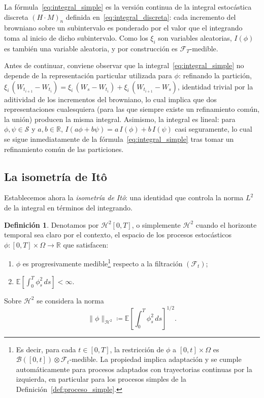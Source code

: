 \documentclass[11pt,a4paper,oneside]{report}
\theoremstyle{plain}
\theoremstyle{definition}
\newtheorem{definicion}[teorema]{Definición}
\theoremstyle{remark}
\newcommand{\R}{\mathbb{R}}
\newcommand{\E}{\mathbb{E}}
\newcommand{\F}{\mathcal{F}}
\newcommand{\1}{\mathbf{1}}
\newcommand{\eqdef}{\coloneqq}
\begin{document}
La fórmula~\eqref{eq:integral_simple} es la versión continua de la
integral estocástica discreta $(H \cdot M)_n$ definida
en~\eqref{eq:integral_discreta}: cada incremento del browniano sobre
un subintervalo es ponderado por el valor que el integrando toma al
inicio de dicho subintervalo. Como los $\xi_i$ son variables aleatorias,
$I(\phi)$ es también una variable aleatoria, y por construcción es
$\F_T$-medible.

Antes de continuar,
conviene observar que la integral~\eqref{eq:integral_simple} no
depende de la representación particular utilizada para $\phi$:
refinando la partición, $\xi_i\, (W_{t_{i+1}} - W_{t_i}) = \xi_i\,
(W_s - W_{t_i}) + \xi_i\, (W_{t_{i+1}} - W_s)$, identidad trivial por
la aditividad de los incrementos del browniano, lo cual implica que
dos representaciones cualesquiera (para las que siempre existe un refinamiento común, la unión)
producen la misma integral. Asimismo, la integral es lineal: para
$\phi, \psi \in \mathcal{S}$ y $a, b \in \R$, $I(a\phi + b\psi) = a\,
I(\phi) + b\, I(\psi)$ casi seguramente, lo cual se sigue inmediatamente
de la fórmula~\eqref{eq:integral_simple} tras tomar un refinamiento
común de las particiones.

\subsection{La isometría de Itô}
\label{subsec:isometria_ito}

Establecemos ahora la \emph{isometría de Itô}: una identidad
que controla la norma $L^2$ de la integral en términos del integrando.

\medskip

\begin{definicion}
\label{def:H2}
Denotamos por $\mathcal{H}^2[0, T]$, o simplemente $\mathcal{H}^2$
cuando el horizonte temporal sea claro por el contexto, el espacio de
los procesos estocásticos $\phi : [0, T] \times \Omega \to \R$ que
satisfacen:
\begin{enumerate}[label=\textnormal{(\roman*)}]
   \item $\phi$ es progresivamente medible\footnote{Es decir, para cada
      $t \in [0, T]$, la restricción de $\phi$ a $[0, t] \times
      \Omega$ es $\mathcal{B}([0, t]) \otimes \F_t$-medible. La
      propiedad implica adaptación y se cumple automáticamente para
      procesos adaptados con trayectorias continuas por la izquierda,
      en particular para los procesos simples de la
      Definición~\ref{def:proceso_simple}.} respecto a la filtración
      $(\F_t)$;
  \item $\displaystyle \E\!\left[\int_0^T \phi_s^2\, ds\right] < \infty.$
\end{enumerate}
Sobre $\mathcal{H}^2$ se considera la norma
\begin{equation}\label{eq:norma_H2}
  \|\phi\|_{\mathcal{H}^2}
  \eqdef \E\!\left[\int_0^T \phi_s^2\, ds\right]^{\!1/2}.
\end{equation}
\end{definicion}
\end{document}
